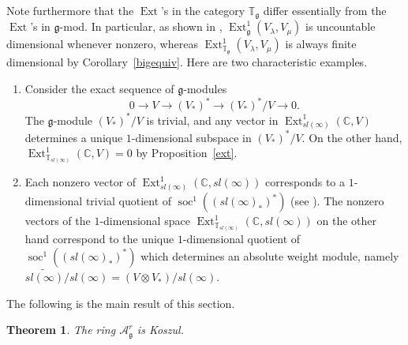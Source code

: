 \documentclass{amsart}
\renewcommand{\sl}{sl}
\newcommand{\T}{\mathbb T}
\newcommand{\Tg}{\mathbb T_{\mathfrak g}}
\renewcommand{\gg}{\mathfrak{g}}
\newcommand{\CC}{\mathbb{C}}
\newcommand{\soc}{\operatorname{soc}}
\newtheorem{thm}{Theorem}[section]
\theoremstyle{definition}
\numberwithin{equation}{section}
\begin{document}
Note furthermore that the $\operatorname{Ext}$'s in the category $\Tg$ differ essentially from the $\operatorname{Ext}$'s in $\gg$-mod.  In particular, as shown in \cite{PS}, $\operatorname{Ext}_\gg^1 (V_\lambda, V_\mu)$ is uncountable dimensional whenever nonzero, whereas $\operatorname{Ext}_{\Tg}^1 (V_\lambda, V_\mu)$ is always finite dimensional by Corollary~\ref{bigequiv}.  Here are two characteristic examples.
\begin{enumerate}
\item Consider the exact sequence of $\gg$-modules
$$ 0 \rightarrow V \rightarrow (V_*)^* \rightarrow (V_*)^* / V \rightarrow 0.$$
The $\gg$-module $(V_*)^* / V$ is trivial, and any vector in $\operatorname{Ext}_{\sl(\infty)}^1 (\CC , V)$ determines a unique $1$-dimensional subspace in $(V_*)^* / V$.  On the other hand, $\operatorname{Ext}_{\T_{\sl(\infty)}}^1 (\CC , V) = 0$ by Proposition~\ref{ext}.
\item Each nonzero vector of $\operatorname{Ext}_{\sl(\infty)}^1 (\CC , \sl(\infty))$ corresponds to a $1$-dimensional trivial quotient of $\soc^1 ((\sl(\infty)_*)^*)$ (see \cite{PS}).  The nonzero vectors of the $1$-dimensional space $\operatorname{Ext}_{\T_{\sl(\infty)}}^1 (\CC , \sl(\infty))$ on the other hand correspond to the unique $1$-dimensional quotient of $\soc^1 ((\sl(\infty)_*)^*)$ which determines an absolute weight module, namely $\tilde{\sl(\infty)} / \sl(\infty) = (V \otimes V_*) / \sl(\infty)$.
\end{enumerate}

The following is the main result of this section.

\begin{thm}\label{koszulity} 
The ring $\mathcal A^r_\gg$ is Koszul.
\end{thm}
\end{document}
